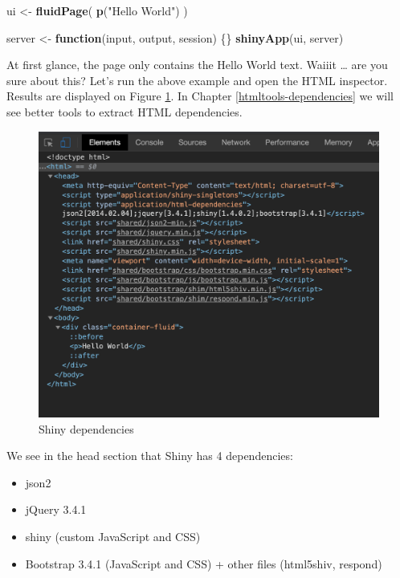 \documentclass[]{book}
\newenvironment{Shaded}{\begin{snugshade}}{\end{snugshade}}
\newcommand{\ControlFlowTok}[1]{\textcolor[rgb]{0.13,0.29,0.53}{\textbf{#1}}}
\newcommand{\KeywordTok}[1]{\textcolor[rgb]{0.13,0.29,0.53}{\textbf{#1}}}
\newcommand{\NormalTok}[1]{#1}
\newcommand{\StringTok}[1]{\textcolor[rgb]{0.31,0.60,0.02}{#1}}
\providecommand{\tightlist}{%
  \setlength{\itemsep}{0pt}\setlength{\parskip}{0pt}}
\begin{document}
\begin{Shaded}
\begin{Highlighting}[]
\NormalTok{ui <-}\StringTok{ }\KeywordTok{fluidPage}\NormalTok{(}
  \KeywordTok{p}\NormalTok{(}\StringTok{"Hello World"}\NormalTok{)}
\NormalTok{)}

\NormalTok{server <-}\StringTok{ }\ControlFlowTok{function}\NormalTok{(input, output, session) \{\}}
\KeywordTok{shinyApp}\NormalTok{(ui, server)}
\end{Highlighting}
\end{Shaded}

At first glance, the page only contains the Hello World text. Waiiit \ldots{} are you sure about this? Let's run the above example and open the HTML inspector. Results are displayed on Figure \ref{fig:shiny-deps}. In Chapter \ref{htmltools-dependencies} we will see better tools to extract HTML dependencies.

\begin{figure}
\includegraphics[width=14.92in]{images/survival-kit/shiny-deps} \caption{Shiny dependencies}\label{fig:shiny-deps}
\end{figure}

We see in the head section that Shiny has 4 dependencies:

\begin{itemize}
\tightlist
\item
  json2
\item
  jQuery 3.4.1
\item
  shiny (custom JavaScript and CSS)
\item
  Bootstrap 3.4.1 (JavaScript and CSS) + other files (html5shiv, respond)
\end{itemize}
\end{document}
